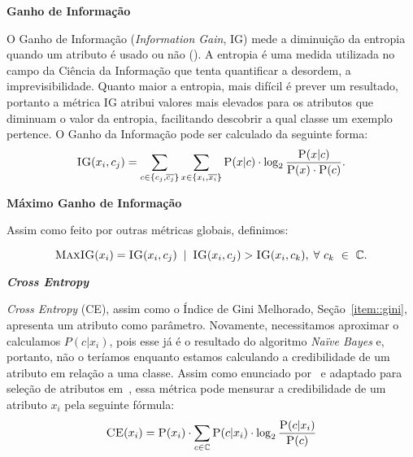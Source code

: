 \begin{description}
\item{\textbf{Ganho de Informação}}
\label{item::ig}

O Ganho de Informação (\textit{Information Gain}, \textsc{IG}) mede a diminuição da entropia quando um atributo é usado ou não (\cite{Yang97}). A entropia é uma medida utilizada no campo da Ciência da Informação que tenta quantificar a desordem, a imprevisibilidade. Quanto maior a entropia, mais difícil é prever um resultado, portanto a métrica \textsc{IG} atribui valores mais elevados para os atributos que diminuam o valor da entropia, facilitando descobrir a qual classe um exemplo pertence. O Ganho da Informação pode ser calculado da seguinte forma:
\begin{equation}\label{eqn::ig}
 \textsc{IG}(x_i, c_j) = \sum_{c \in \{c_j, \overline{c_j}\}}\sum_{x \in \{x_i, \overline{x_i}\}} \textsc{P}(x|c) \cdot \log_2\frac{\textsc{P}(x|c)}{ \textsc{P}(x) \cdot \textsc{P}(c)}.
\end{equation}

\item{\textbf{Máximo Ganho de Informação}}
\label{item::maxig}

Assim como feito por outras métricas globais, definimos:

\begin{equation}\label{eqn::maxdom}
\textsc{MaxIG}(x_i) = \textsc{IG}(x_i,c_j) \; \; | \;\; \textsc{IG}(x_i, c_j) > \textsc{IG}(x_i, c_k), \; \forall\ c_k\ \in\ \mathbb{C}.
\end{equation}

\item{\textbf{\textit{Cross Entropy}}}
\label{item::}

\textit{Cross Entropy} (\textsc{CE}), assim como o Índice de Gini Melhorado, Seção~\ref{item::gini}, apresenta um atributo como parâmetro. Novamente, necessitamos aproximar o calculamos $P(c|x_i)$, pois esse já é o resultado do algoritmo \textit{Naïve Bayes} e, portanto, não o teríamos enquanto estamos calculando a credibilidade de um atributo em relação a uma classe. Assim como enunciado por~\cite{Koller97} e adaptado para seleção de atributos em~\cite{Mladenic98}, essa métrica pode mensurar a credibilidade de um atributo $x_i$ pela seguinte fórmula:
\begin{equation}\label{eqn::ce}
 \textsc{CE}(x_i) =  \textsc{P}(x_i) \cdot \sum_{c \in \mathbb{C}} \textsc{P}(c|x_i) \cdot \log_2 \frac{ \textsc{P}(c|x_i) } {\textsc{P}(c) }
\end{equation}


\end{description}
